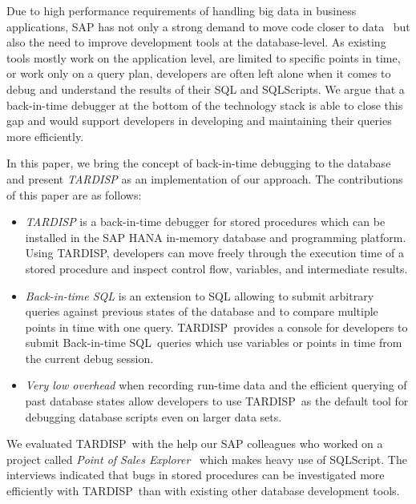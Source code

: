 \documentclass[english,conference]{IEEEtran}
\newcommand{\tool}{TAR\-DISP}
\newcommand{\SQLextension}{Back-in-time SQL}
\begin{document}
Due to high performance requirements of handling big data in business applications, SAP has not only a strong demand to move code closer to data~\cite{plattner2015memory} but also the need to improve development tools at the database-level. 
As existing tools mostly work on the application level, are limited to specific points in time, or work only on a query plan, developers are often left alone when it comes to debug and understand the results of their SQL and SQLScripts.
We argue that a back-in-time debugger at the bottom of the technology stack is able to close this gap and would support developers in developing and maintaining their queries more efficiently. 

In this paper, we bring the concept of back-in-time debugging to the database and present \emph{\tool} as an implementation of our approach.
The contributions of this paper are as follows:
\begin{itemize}
	\item \emph{\tool} is a back-in-time debugger for stored procedures which can be installed in the SAP HANA in-memory database and programming platform.
		Using \tool, developers can move freely through the execution time of a stored procedure and inspect control flow, variables, and intermediate results.
	
	\item \emph{\SQLextension} is an extension to SQL allowing to submit arbitrary queries against previous states of the database 
		and to compare multiple points in time with one query.
		\tool\ provides a console for developers to submit \SQLextension\ queries which use variables or points in time from the current debug session.

	\item \emph{Very low overhead} when recording run-time data and the efficient querying of past database states allow developers to use \tool\ as the default tool for debugging database scripts even on larger data sets.
	
\end{itemize}

We evaluated \tool\ with the help our SAP colleagues who worked on a project called \emph{Point of Sales Explorer}~\cite{plattner2015memory} which makes heavy use of SQLScript. 
The interviews indicated that bugs in stored procedures can be investigated more efficiently with \tool\ than with existing other database development tools.
\end{document}
